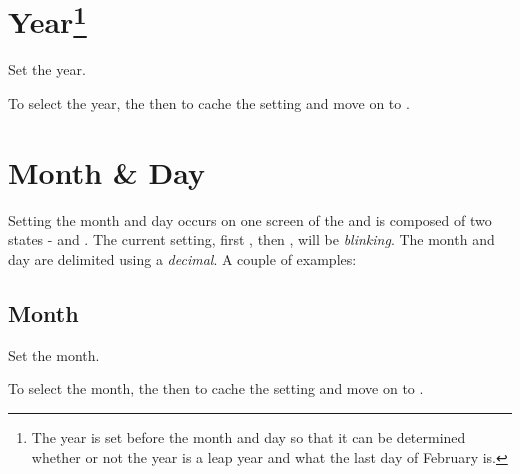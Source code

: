 \section[Year]{Year\footnote{ The year is set before the month and day so
  that it can be determined whether or not the year is a leap year and what the
  last day of February is.}} 

Set the year.

\par\medskip


To select the year,  the  then  to cache the setting and
move on to .


\section{Month \& Day}

Setting the month and day occurs on one screen of the  and is composed of
two states -  and . The current setting, first , then
, will be \textit{blinking}.  The month and day are delimited using a
\textit{decimal}.  A couple of examples:


\subsection{Month} 

Set the month.

\par\medskip

To select the month,  the  then  to cache the setting and
move on to .


